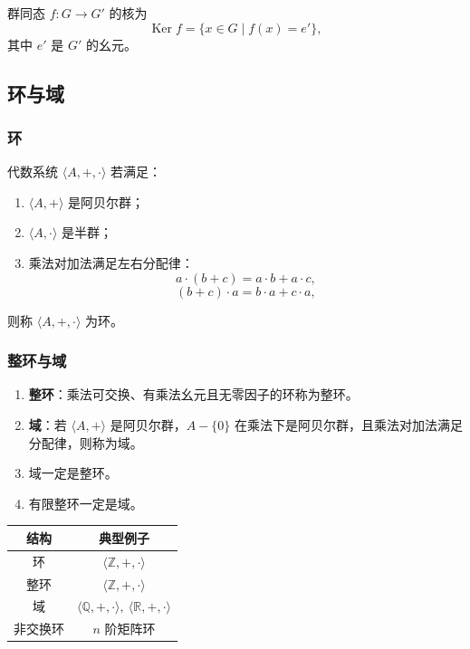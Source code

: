 群同态 \(f:G\to G'\) 的核为
\[
\operatorname{Ker}f=\{x\in G\mid f(x)=e'\},
\]
其中 \(e'\) 是 \(G'\) 的幺元。

\subsection{环与域}

\subsubsection{环}

代数系统 \(\langle A,+,\cdot\rangle\) 若满足：
\begin{enumerate}
	\item \(\langle A,+\rangle\) 是阿贝尔群；
	\item \(\langle A,\cdot\rangle\) 是半群；
	\item 乘法对加法满足左右分配律：
	\[
	a\cdot(b+c)=a\cdot b+a\cdot c,
	\]
	\[
	(b+c)\cdot a=b\cdot a+c\cdot a,
	\]
\end{enumerate}
则称 \(\langle A,+,\cdot\rangle\) 为环。

\subsubsection{整环与域}

\begin{enumerate}
	\item \textbf{整环}：乘法可交换、有乘法幺元且无零因子的环称为整环。
	\item \textbf{域}：若 \(\langle A,+\rangle\) 是阿贝尔群，\(A-\{0\}\) 在乘法下是阿贝尔群，且乘法对加法满足分配律，则称为域。
	\item 域一定是整环。
	\item 有限整环一定是域。
\end{enumerate}

\begin{center}
	\begin{tabular}{cc}
		\toprule
		结构 & 典型例子\\
		\midrule
		环 & \(\langle\mathbb{Z},+,\cdot\rangle\)\\
		整环 & \(\langle\mathbb{Z},+,\cdot\rangle\)\\
		域 & \(\langle\mathbb{Q},+,\cdot\rangle,\ \langle\mathbb{R},+,\cdot\rangle\)\\
		非交换环 & \(n\) 阶矩阵环\\
		\bottomrule
	\end{tabular}
\end{center}

